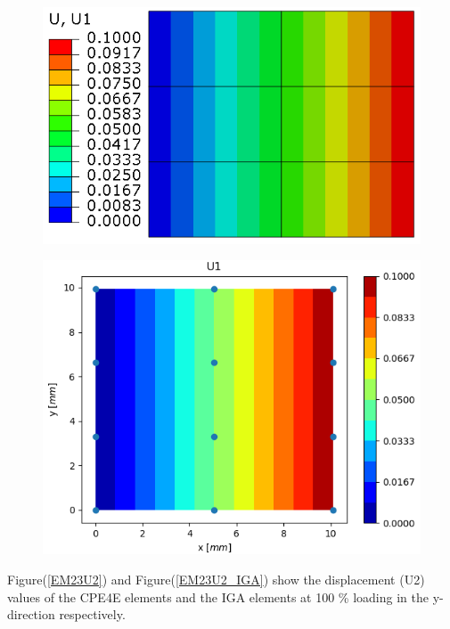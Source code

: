 \documentclass[11pt]{article}
\begin{document}
\begin{figure}[H]
	\centering
	\begin{minipage}{.5\textwidth}
		\centering
		\includegraphics[width=1\linewidth]{EM23U1.png}
		\label{EM23U1}
	\end{minipage}%
	\begin{minipage}{.5\textwidth}
		\centering
		\includegraphics[width=1\linewidth]{EM23U1_IGA.png}
		\label{EM23U1_IGA}
	\end{minipage}
\end{figure}
\noindent
Figure(\ref{EM23U2}) and Figure(\ref{EM23U2_IGA}) show the displacement (U2) values of the CPE4E elements and the IGA elements at 100 \% loading in the y-direction respectively. \\
\end{document}
